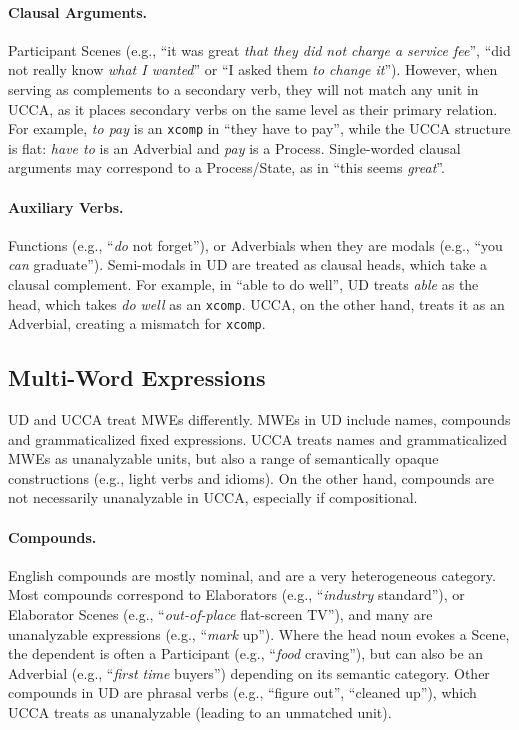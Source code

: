 \documentclass[11pt,a4paper]{article}
\begin{document}
\paragraph{Clausal Arguments.}
    Participant Scenes
    (e.g., ``it was great \textit{that they did not charge a service fee}'',
    ``did not really know \textit{what I wanted}'' or
    ``I asked them \textit{to change it}'').
    However, when serving as complements to a secondary verb, they
    will not match any unit in UCCA, as it places secondary verbs on the 
    same level as their primary relation. 
    For example, \textit{to pay} is an \texttt{xcomp} in ``they have to pay'', while
    the UCCA structure is flat: \textit{have to} is an Adverbial and \textit{pay} is a Process.
    Single-worded clausal arguments may correspond to a Process/State,
    as in ``this seems \textit{great}''.

\paragraph{Auxiliary Verbs.} Functions (e.g., ``\textit{do} not forget''),
    or Adverbials when they are modals (e.g., ``you \textit{can} graduate''). Semi-modals 
    in UD are treated as clausal heads, which take a clausal complement. 
    For example, in ``able to do well'', UD treats \textit{able} as the head,
    which takes \textit{do well} as an \texttt{xcomp}. UCCA, on the other hand,
    treats it as an Adverbial, creating a mismatch for \texttt{xcomp}.
    

\subsection{Multi-Word Expressions}\label{sec:mwe}

UD and UCCA treat MWEs differently.
MWEs in UD include names, compounds and grammaticalized fixed expressions.
UCCA treats names and grammaticalized MWEs as unanalyzable units,
but also a range of semantically opaque constructions
(e.g., light verbs and idioms).
On the other hand, compounds are not necessarily unanalyzable in UCCA,
especially if compositional.

\paragraph{Compounds.} English compounds are mostly nominal,
        and are a very heterogeneous category.
        Most compounds correspond to Elaborators (e.g., ``\textit{industry} standard''),
        or Elaborator Scenes (e.g., ``\textit{out-of-place} flat-screen TV''),
        and many are unanalyzable expressions (e.g., ``\textit{mark} up'').
        Where the head noun evokes a Scene, the dependent is often a Participant
        (e.g., ``\textit{food} craving''), but can also be an Adverbial 
        (e.g., ``\textit{first time} buyers'') depending on its semantic category.
        Other compounds in UD are phrasal verbs (e.g., ``figure out'', ``cleaned up''),
        which UCCA treats as unanalyzable (leading to an unmatched unit). 
            
\end{document}
